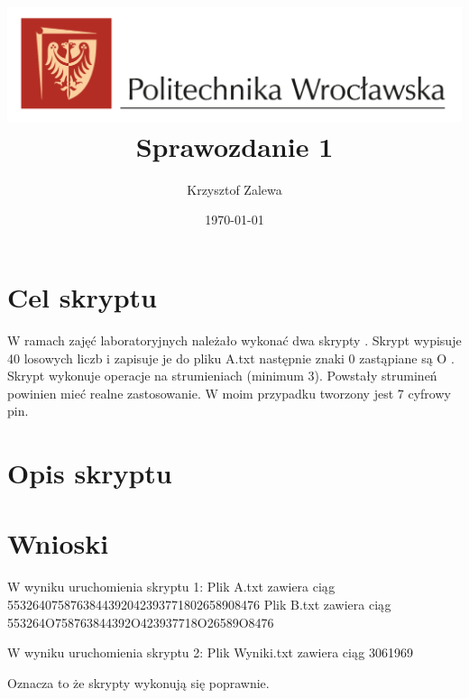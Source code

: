\documentclass{article}
\title{
  \centering
  \includegraphics[width=\textwidth]{images/logo_PWr_kolor_poziom.png}\\
  \fontsize{28pt}{30pt}\selectfont Sprawozdanie 1\\
  }
\author{Krzysztof Zalewa}
\date{\daymonthyear\today}
\begin{document}
    \maketitle
    \pagebreak
    \tableofcontents
    \FloatBarrier
    \raggedright
    \section{Cel skryptu}
        W ramach zajęć laboratoryjnych należało wykonać dwa skrypty . Skrypt wypisuje 40 losowych liczb i zapisuje je do pliku A.txt następnie znaki 0 zastąpiane są O . Skrypt wykonuje operacje na strumieniach (minimum 3). Powstały strumineń powinien mieć realne zastosowanie.
        W moim przypadku tworzony jest 7 cyfrowy pin.
    \section{Opis skryptu}
      
      

    \section{Wnioski}
        W wyniku uruchomienia skryptu 1: \linebreak
        Plik A.txt zawiera ciąg 5532640758763844392042393771802658908476 \linebreak
        Plik B.txt zawiera ciąg 553264O758763844392O423937718O26589O8476 \linebreak

        W wyniku uruchomienia skryptu 2: \linebreak
        Plik Wyniki.txt zawiera ciąg 3061969 \linebreak

        Oznacza to że skrypty wykonują się poprawnie.
\end{document}
